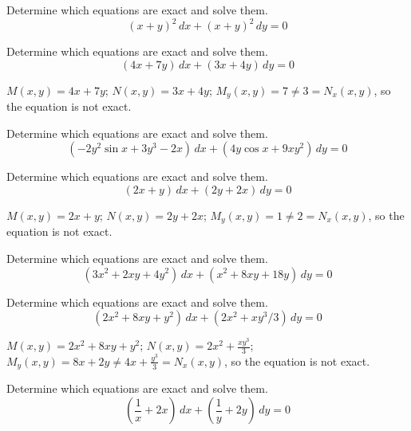 \documentclass{ximera}
\begin{document}
\begin{problem}\label{exer:2.5.5} Determine which equations are exact and solve them.
$$(x+y)^2\,dx+(x+y)^2\,dy=0$$
\end{problem}

\begin{problem}\label{exer:2.5.6} Determine which equations are exact and solve them.
$$(4x+7y)\,dx+(3x+4y)\,dy=0$$



\begin{solution}
    $M(x,y)=4x+7y$;\;
$N(x,y)=3x+4y$;\;
$M_y(x,y)=7\neq 3=N_x(x,y)$,
so the  equation is not exact.
\end{solution}
\end{problem}

\begin{problem}\label{exer:2.5.7} Determine which equations are exact and solve them.
$$(-2y^2\sin x+3y^3-2x)\,dx+(4y\cos x+9xy^2)\,dy=0$$
\end{problem}

\begin{problem}\label{exer:2.5.8} Determine which equations are exact and solve them.
$$(2x+y)\,dx+(2y+2x)\,dy=0$$

\begin{solution}
    $M(x,y)=2x+y$;\;
$N(x,y)=2y+2x$;\;
$M_y(x,y)=1\neq 2=N_x(x,y)$,
so the  equation is not exact.
\end{solution}
\end{problem}

\begin{problem}\label{exer:2.5.9} Determine which equations are exact and solve them.
$$(3x^2+2xy+4y^2)\,dx+(x^2+8xy+18y)\,dy=0$$
\end{problem}

\begin{problem}\label{exer:2.5.10} Determine which equations are exact and solve them.
$$(2x^2+8xy+y^2)\,dx+(2x^2+xy^3/3)\,dy=0$$



\begin{solution}
    $M(x,y)=2x^2+8xy+y^2$;\;
$N(x,y)=2x^2+\frac{xy^3}{3}$;\;
$M_y(x,y)=8x+2y\neq 4x+\frac{y^3}{3}=N_x(x,y)$,
so the  equation is not exact.
\end{solution}
\end{problem}

\begin{problem}\label{exer:2.5.11} Determine which equations are exact and solve them.
$$\left(\frac{1}{x}+2x\right)\,dx+\left(\frac{1}{y}+2y\right)\,dy=0$$
\end{problem}
\end{document}
